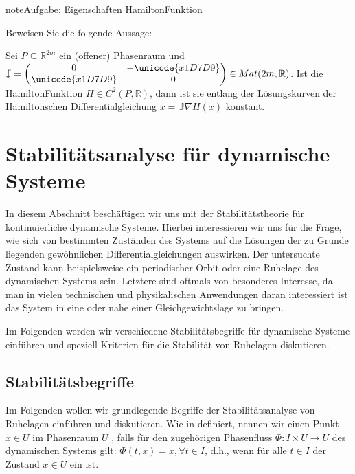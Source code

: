 \documentclass[letterpaper,10pt,english]{jupyterBook}
\begin{document}
\begin{sphinxadmonition}{note}{Aufgabe: Eigenschaften Hamilton\sphinxhyphen{}Funktion}

\sphinxAtStartPar
Beweisen Sie die folgende Aussage:

\sphinxAtStartPar
Sei \(P \subseteq \mathbb{R}^{2m}\) ein (offener) Phasenraum und \(\mathbb{J} = \begin{pmatrix} 0 & - \unicode{x1D7D9} \\ \unicode{x1D7D9} & 0 \end{pmatrix} \in Mat(2m, \mathbb{R})\). Ist die Hamilton\sphinxhyphen{}Funktion \(H \in C^2(P, \mathbb{R})\), dann ist sie entlang der Lösungskurven der Hamiltonschen Differentialgleichung \(\dot x = \mathbb{J} \nabla H(x)\) konstant.
\end{sphinxadmonition}


\chapter{Stabilitätsanalyse für dynamische Systeme}
\label{\detokenize{ode_stability/stabilitaetsanalyse:stabilitatsanalyse-fur-dynamische-systeme}}\label{\detokenize{ode_stability/stabilitaetsanalyse::doc}}
\sphinxAtStartPar
In diesem Abschnitt beschäftigen wir uns mit der Stabilitätstheorie für kontinuierliche dynamische Systeme.
Hierbei interessieren wir uns für die Frage, wie sich  von bestimmten Zuständen des Systems auf die Lösungen der zu Grunde liegenden gewöhnlichen Differentialgleichungen auswirken.
Der untersuchte Zustand kann beispielsweise ein periodischer Orbit oder eine Ruhelage des dynamischen Systems sein.
Letztere sind oftmals von besonderes Interesse, da man in vielen technischen und physikalischen Anwendungen daran interessiert ist das System in eine oder nahe einer Gleichgewichtslage zu bringen.

\sphinxAtStartPar
Im Folgenden werden wir verschiedene Stabilitätsbegriffe für dynamische Systeme einführen und speziell Kriterien für die Stabilität von Ruhelagen diskutieren.


\section{Stabilitätsbegriffe}
\label{\detokenize{ode_stability/stabilitaetsbegriffe:stabilitatsbegriffe}}\label{\detokenize{ode_stability/stabilitaetsbegriffe::doc}}
\sphinxAtStartPar
Im Folgenden wollen wir grundlegende Begriffe der Stabilitätsanalyse von Ruhelagen einführen und diskutieren.
Wie in {\hyperref[\detokenize{ode/fluesse:s-fluesse}]{}} definiert, nennen wir einen Punkt \(x\in U\) im Phasenraum \(U\) , falls für den zugehörigen Phasenfluss \(\Phi \colon I \times U \rightarrow U\) des dynamischen Systems gilt: \(\Phi(t,x) = x, \forall t \in I\), d.h., wenn für alle \(t \in I\) der Zustand \(x \in U\) ein  ist.
\end{document}
